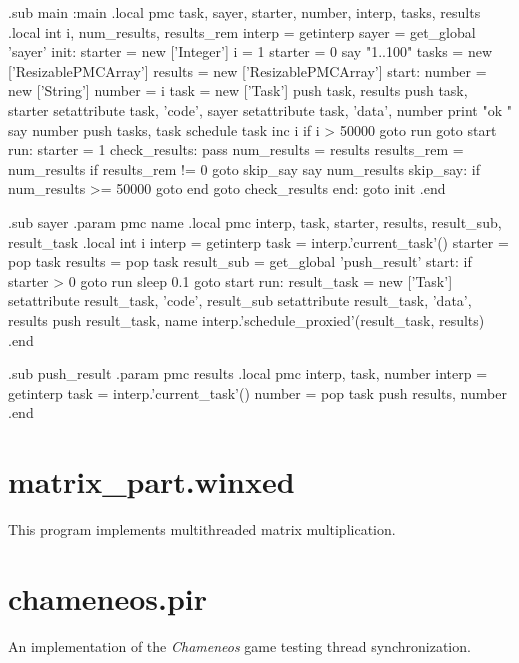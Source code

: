 \documentclass[bachelor,english]{hgbthesis}
\begin{document}
\begin{GenericCode}
.sub main :main
    .local pmc task, sayer, starter, number, interp, tasks, results
    .local int i, num_results, results_rem
    interp = getinterp
    sayer = get_global 'sayer'
init:
    starter = new ['Integer']
    i = 1
    starter = 0
    say "1..100"
    tasks = new ['ResizablePMCArray']
    results = new ['ResizablePMCArray']
start:
    number = new ['String']
    number = i
    task = new ['Task']
    push task, results
    push task, starter
    setattribute task, 'code', sayer
    setattribute task, 'data', number
    print "ok "
    say number
    push tasks, task
    schedule task
    inc i
    if i > 50000 goto run
    goto start
run:
    starter = 1
check_results:
    pass
    num_results = results
    results_rem = num_results %
    if results_rem != 0 goto skip_say
    say num_results
skip_say:
    if num_results >= 50000 goto end
    goto check_results
end:
    goto init
.end

.sub sayer
    .param pmc name
    .local pmc interp, task, starter, results, result_sub, result_task
    .local int i
    interp = getinterp
    task = interp.'current_task'()
    starter    = pop task
    results    = pop task
    result_sub = get_global 'push_result'
start:
    if starter > 0 goto run
    sleep 0.1
    goto start
run:
    result_task = new ['Task']
    setattribute result_task, 'code', result_sub
    setattribute result_task, 'data', results
    push result_task, name
    interp.'schedule_proxied'(result_task, results)
.end

.sub push_result
    .param pmc results
    .local pmc interp, task, number
    interp = getinterp
    task = interp.'current_task'()
    number = pop task
    push results, number
.end
\end{GenericCode}

\chapter{matrix\_part.winxed}
\label{app:matrix_part}

This program implements multithreaded matrix multiplication.



\chapter{chameneos.pir}
\label{app:chameneos_part}

An implementation of the \textit{Chameneos} game testing thread synchronization.





\end{document}
